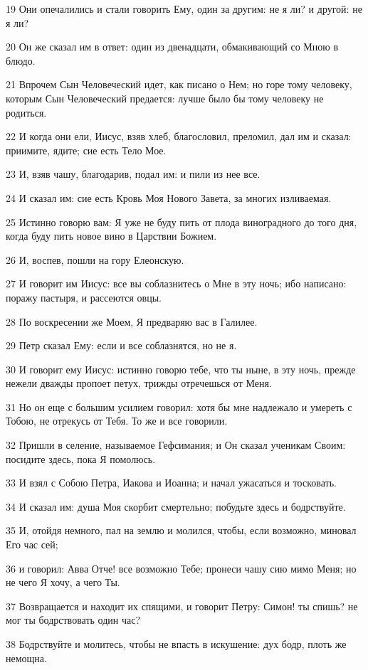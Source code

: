 \par 19 Они опечалились и стали говорить Ему, один за другим: не я ли? и другой: не я ли?
\par 20 Он же сказал им в ответ: один из двенадцати, обмакивающий со Мною в блюдо.
\par 21 Впрочем Сын Человеческий идет, как писано о Нем; но горе тому человеку, которым Сын Человеческий предается: лучше было бы тому человеку не родиться.
\par 22 И когда они ели, Иисус, взяв хлеб, благословил, преломил, дал им и сказал: приимите, ядите; сие есть Тело Мое.
\par 23 И, взяв чашу, благодарив, подал им: и пили из нее все.
\par 24 И сказал им: сие есть Кровь Моя Нового Завета, за многих изливаемая.
\par 25 Истинно говорю вам: Я уже не буду пить от плода виноградного до того дня, когда буду пить новое вино в Царствии Божием.
\par 26 И, воспев, пошли на гору Елеонскую.
\par 27 И говорит им Иисус: все вы соблазнитесь о Мне в эту ночь; ибо написано: поражу пастыря, и рассеются овцы.
\par 28 По воскресении же Моем, Я предваряю вас в Галилее.
\par 29 Петр сказал Ему: если и все соблазнятся, но не я.
\par 30 И говорит ему Иисус: истинно говорю тебе, что ты ныне, в эту ночь, прежде нежели дважды пропоет петух, трижды отречешься от Меня.
\par 31 Но он еще с большим усилием говорил: хотя бы мне надлежало и умереть с Тобою, не отрекусь от Тебя. То же и все говорили.
\par 32 Пришли в селение, называемое Гефсимания; и Он сказал ученикам Своим: посидите здесь, пока Я помолюсь.
\par 33 И взял с Собою Петра, Иакова и Иоанна; и начал ужасаться и тосковать.
\par 34 И сказал им: душа Моя скорбит смертельно; побудьте здесь и бодрствуйте.
\par 35 И, отойдя немного, пал на землю и молился, чтобы, если возможно, миновал Его час сей;
\par 36 и говорил: Авва Отче! все возможно Тебе; пронеси чашу сию мимо Меня; но не чего Я хочу, а чего Ты.
\par 37 Возвращается и находит их спящими, и говорит Петру: Симон! ты спишь? не мог ты бодрствовать один час?
\par 38 Бодрствуйте и молитесь, чтобы не впасть в искушение: дух бодр, плоть же немощна.
